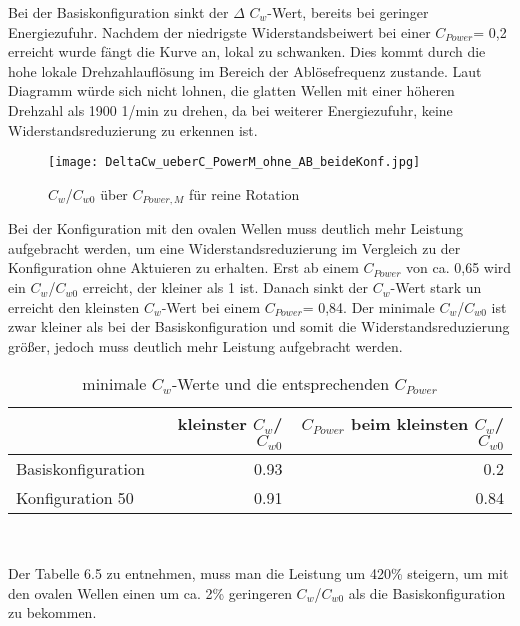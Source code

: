 Bei der Basiskonfiguration sinkt der $\Delta$ $C_{w}$-Wert, bereits bei geringer Energiezufuhr.  Nachdem der niedrigste Widerstandsbeiwert bei einer $C_{Power}$= 0,2 erreicht wurde f\"angt die Kurve an, lokal zu schwanken. Dies kommt durch die hohe lokale Drehzahlaufl\"osung im Bereich der Abl\"osefrequenz zustande. Laut Diagramm w\"urde sich nicht lohnen, die glatten Wellen mit einer h\"oheren Drehzahl als 1900  1/min zu drehen, da bei weiterer Energiezufuhr, keine Widerstandsreduzierung zu erkennen ist.
\begin{figure}[h]
	\centering
	\texttt{[image: DeltaCw\_ueberC\_PowerM\_ohne\_AB\_beideKonf.jpg]}
	\caption{ $C_{w}$/$C_{w0}$ \"uber $C_{Power,M}$ f\"ur reine Rotation  }
	\label{fig:Cw-Cw0-CpowerM_reine}
\end{figure}
Bei der Konfiguration mit den ovalen Wellen muss deutlich mehr Leistung aufgebracht werden, um eine Widerstandsreduzierung im Vergleich zu der Konfiguration ohne Aktuieren zu erhalten.  Erst ab einem $C_{Power}$ von ca. 0,65 wird ein $C_{w}$/$C_{w0}$ erreicht, der kleiner als 1 ist. 
Danach sinkt der $C_{w}$-Wert stark un erreicht den kleinsten $C_{w}$-Wert bei einem $C_{Power}$= 0,84. 
Der minimale $C_{w}$/$C_{w0}$ ist zwar kleiner als bei der Basiskonfiguration und somit die Widerstandsreduzierung gr\"o\ss{}er, jedoch muss deutlich mehr Leistung aufgebracht werden.
\begin{table}[h]
	\centering
	\begin{tabular}{lrr}
		\toprule
		 & kleinster  $C_{w}$/$C_{w0}$ & $C_{Power}$ beim kleinsten $C_{w}$/$C_{w0}$ \\
		\midrule
		Basiskonfiguration & 0.93 & 0.2\\
		Konfiguration 50 & 0.91 & 0.84\\
		\bottomrule
	\end{tabular}\\
	\caption{ minimale  $C_{w}$-Werte und die entsprechenden $C_{Power}$ }
	\label{tab:minimalCw-Cpower}
\end{table}
Der Tabelle 6.5 zu entnehmen, muss man die Leistung um 420\% steigern, um mit den ovalen Wellen einen um ca. 2\% geringeren $C_{w}$/$C_{w0}$ als die Basiskonfiguration zu bekommen.


